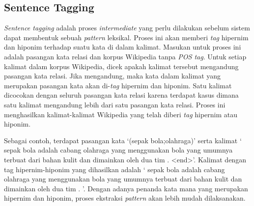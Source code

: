 \subsection{Sentence Tagging}
\textit{Sentence tagging} adalah proses \textit{intermediate} yang perlu dilakukan sebelum sistem dapat membentuk sebuah \textit{pattern} leksikal. Proses ini akan memberi \textit{tag} hipernim dan hiponim terhadap suatu kata di dalam kalimat. Masukan untuk proses ini adalah pasangan kata relasi dan korpus Wikipedia tanpa \textit{POS tag}. Untuk setiap kalimat dalam korpus Wikipedia, dicek apakah kalimat tersebut mengandung pasangan kata relasi. Jika mengandung, maka kata dalam kalimat yang merupakan pasangan kata akan di-\textit{tag} hipernim dan hiponim. Satu kalimat dicocokan dengan seluruh pasangan kata relasi karena terdapat kasus dimana satu kalimat mengandung lebih dari satu pasangan kata relasi. Proses ini menghasilkan kalimat-kalimat Wikipedia yang telah diberi \textit{tag} hipernim atau hiponim.

Sebagai contoh, terdapat pasangan kata `(sepak bola;olahraga)' serta kalimat `{\tagStart} sepak bola adalah cabang olahraga yang menggunakan bola yang umumnya terbuat dari bahan kulit dan dimainkan oleh dua tim . {\selectfont<end>}'. Kalimat dengan tag hipernim-hiponim yang dihasilkan adalah `{\tagStart} {\tagHyponym}sepak bola{\tagHyponymEnd} adalah cabang {\tagHypernym}olahraga{\tagHypernymEnd} yang menggunakan bola yang umumnya terbuat dari bahan kulit dan dimainkan oleh dua tim . {\tagEnd}'. Dengan adanya penanda kata mana yang merupakan hipernim dan hiponim, proses ekstraksi \textit{pattern} akan lebih mudah dilaksanakan.

